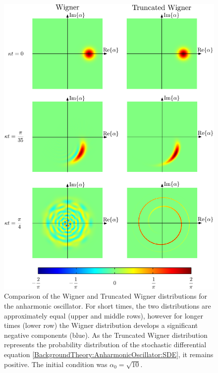 \begin{figure}
    \centering
    \includegraphics[width=14cm]{WignerTruncatedWignerComparison}
    \caption{
        Comparison of the Wigner and Truncated Wigner distributions for the anharmonic oscillator.  For short times, the two distributions are approximately equal (upper and middle rows), however for longer times (lower row) the Wigner distribution develops a significant negative components (blue).  As the Truncated Wigner distribution represents the probability distribution of the stochastic differential equation \eqref{BackgroundTheory:AnharmonicOscillator:SDE}, it remains positive.  The initial condition was $\alpha_0 = \sqrt{10}$. \label{BackgroundTheory:WignerTruncatedWignerComparison}
    }
\end{figure}




